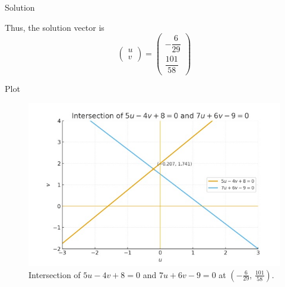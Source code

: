 \documentclass{beamer}
\theoremstyle{remark}
\newcommand{\myvec}[1]{\ensuremath{\begin{pmatrix}#1\end{pmatrix}}}
\begin{document}
\begin{frame}{Solution}

Thus, the solution vector is
\begin{equation}
\myvec{u \\ v}=\myvec{-\dfrac{6}{29} \\ \dfrac{101}{58}} \tag{9}
\end{equation}
\end{frame}


\begin{frame}{Plot}
  \begin{figure}[H]
  \centering
  \includegraphics[width=0.8\linewidth]{figs/matgeo-5.2.2.jpeg}
  \caption{Intersection of $5u-4v+8=0$ and $7u+6v-9=0$ at
           $\left(-\tfrac{6}{29},\,\tfrac{101}{58}\right)$.}
  \label{fig:5.2.2}
\end{figure}
\end{frame}
\end{document}
